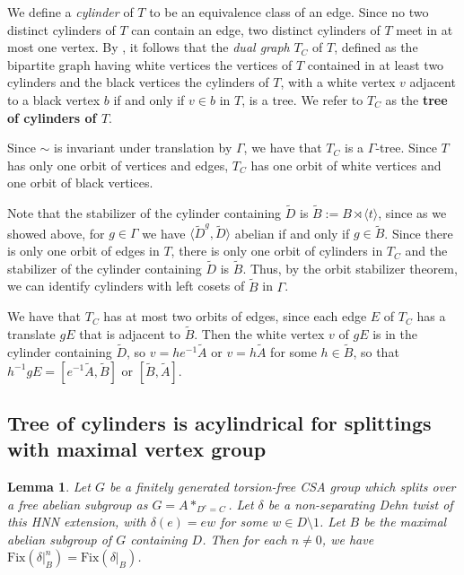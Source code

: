 \documentclass{amsart}
\theoremstyle{plain}
\newtheorem{lemma}[thm]{Lemma}
\theoremstyle{definition}
\theoremstyle{remark}
\begin{document}
We define a \textit{cylinder} of $T$ to be an equivalence class of an edge. Since no two distinct cylinders of $T$ can contain an edge, two distinct cylinders of $T$ meet in at most one vertex. By \cite[Section 4.5]{Limit_groups_groups_acting_freely}, it follows that the \textit{dual graph} $T_C$ of $T$, defined as the bipartite graph having white vertices the vertices of $T$ contained in at least two cylinders and the black vertices the cylinders of $T$, with a white vertex $v$ adjacent to a black vertex $b$ if and only if $v \in b$ in $T$, is a tree. We refer to $T_C$ as the \textbf{tree of cylinders of $T$}. 

Since $\sim$ is invariant under translation by $\Gamma$, we have that $T_C$ is a $\Gamma$-tree. Since $T$ has only one orbit of vertices and edges, $T_C$ has one orbit of white vertices and one orbit of black vertices. 

Note that the stabilizer of the cylinder containing $\tilde{D}$ is $\tilde{B} := B \rtimes \langle t \rangle$, since as we showed above, for $g \in \Gamma$ we have $\langle \tilde{D}^g, \tilde{D} \rangle$ abelian if and only if $g \in \tilde{B}$. Since there is only one orbit of edges in $T$, there is only one orbit of cylinders in $T_C$ and the stabilizer of the cylinder containing $\tilde{D}$ is $\tilde{B}$. Thus, by the orbit stabilizer theorem, we can identify cylinders with left cosets of $\tilde{B}$ in $\Gamma$. 

We have that $T_C$ has at most two orbits of edges, since each edge $E$ of $T_C$ has a translate $gE$ that is adjacent to $\tilde{B}$. Then the white vertex $v$ of $gE$ is in the cylinder containing $\tilde{D}$, so $v = he^{-1} \tilde{A}$ or $v = h \tilde{A}$ for some $h \in \tilde{B}$, so that $h^{-1}gE = [e^{-1}\tilde{A}, \tilde{B}]$ or $[\tilde{B}, \tilde{A}]$. 

\subsection{Tree of cylinders is acylindrical for splittings with maximal vertex group}
\label{section: tree of cylinders for non-separating Dehn twist}

\begin{lemma}
    \label{lem: Fixed point set of powers}
    Let $G$ be a finitely generated torsion-free CSA group which splits over a free abelian subgroup as $G = A*_{D^e=C}$. Let $\delta$ be a non-separating Dehn twist of this HNN extension, with $\delta(e) = ew$ for some $w \in D \setminus 1$. Let $B$ be the maximal abelian subgroup of $G$ containing $D$. Then for each $n \neq 0$, we have $\mathrm{Fix}(\delta \vert_B^n) = \mathrm{Fix}(\delta \vert_B)$.
\end{lemma}
\end{document}

